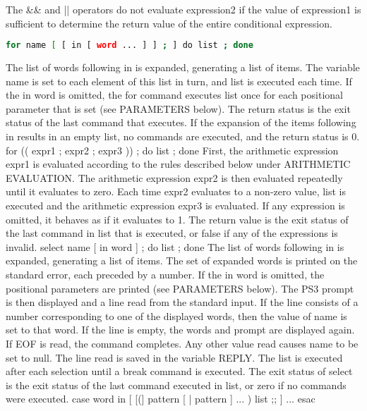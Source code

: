 \documentclass[11pt]{article}
\begin{document}
The \&\& and || operators do not evaluate expression2 if the value of expression1 is sufficient to determine the return value of the entire conditional expression.
\begin{lstlisting}[language=bash]
for name [ [ in [ word ... ] ] ; ] do list ; done
\end{lstlisting}
The list of words following in is expanded, generating a list of items. The variable name is set to each element of this list in turn, and list is executed each time. If the in word is omitted, the for command executes list once for each positional parameter that is set (see PARAMETERS below). The return status is the exit status of the last command that executes. If the expansion of the items following in results in an empty list, no commands are executed, and the return status is 0.
for (( expr1 ; expr2 ; expr3 )) ; do list ; done
First, the arithmetic expression expr1 is evaluated according to the rules described below under ARITHMETIC EVALUATION. The arithmetic expression expr2 is then evaluated repeatedly until it evaluates to zero. Each time expr2 evaluates to a non-zero value, list is executed and the arithmetic expression expr3 is evaluated. If any expression is omitted, it behaves as if it evaluates to 1. The return value is the exit status of the last command in list that is executed, or false if any of the expressions is invalid.
select name [ in word ] ; do list ; done
The list of words following in is expanded, generating a list of items. The set of expanded words is printed on the standard error, each preceded by a number. If the in word is omitted, the positional parameters are printed (see PARAMETERS below). The PS3 prompt is then displayed and a line read from the standard input. If the line consists of a number corresponding to one of the displayed words, then the value of name is set to that word. If the line is empty, the words and prompt are displayed again. If EOF is read, the command completes. Any other value read causes name to be set to null. The line read is saved in the variable REPLY. The list is executed after each selection until a break command is executed. The exit status of select is the exit status of the last command executed in list, or zero if no commands were executed.
case word in [ [(] pattern [ | pattern ] ... ) list ;; ] ... esac
\end{document}
